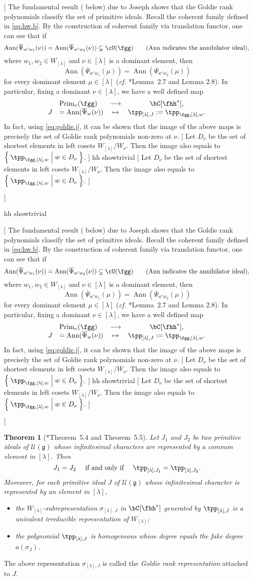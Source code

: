 \documentclass[12pt,a4paper]{amsart}
\newcommand{\trivial}[2][]{\if\relax\detokenize{#1}\relax
  {%
      \color{orange} \vspace{0em} $[$  #2 $]$
      \color{black}
  }
  \else
\ifx#1h
\ifcsname showtrivial\endcsname
{%
    \color{orange} \vspace{0em}  $[$ #2 $]$
    \color{black}
}
\fi
\else {\red Wrong argument!} \fi
\fi
}
\newcommand{\CU}{{\mathcal {U}}}
\DeclareMathOperator{\Ann}{Ann}
\newcommand{\g}{\mathfrak g}
\numberwithin{equation}{section}
\newtheorem{thm}{Theorem}[section]
\theoremstyle{remark}
\def\cf{\emph{cf.} }
\def\WLam{W_{\Lam}}
\def\Prim{\mathrm{Prim}}
\def\Prim{\mathrm{Prim}}
\newcommand{\Lam}{{[\lambda]}}
\begin{document}
\trivial[h]{
The fundamental result ( below) due to Joseph shows that the Goldie rank polynomials
classify the set of primitive ideals.
 Recall the coherent family defined in \eqref{eq:hw.b}.
By the construction of coherent family via translation functor, one can see that if
\[
\Ann(\overline\Psi_{w' w_1} (\nu)) = \Ann(\overline \Psi_{w' w_2}(\nu))\subsetneq \cU(\fgg)\qquad(\textrm{$\Ann$ indicates the annihilator ideal}),
\]
where $w_1,w_2\in \WLam$ and $\nu\in \Lam$ is a dominant element, then
\[
\Ann(\overline\Psi_{w'w_1} (\mu)) = \Ann(\overline \Psi_{w'w_2}(\mu))
\]
 for every dominant
element $\mu\in \Lam$ (\cf \cite{V1}*{Lemma~2.7 and Lemma 2.8}).
In particular, fixing a dominant $\nu\in \Lam$, we have a well defined map
\[
\begin{array}{rlcc}
&\Prim_{\nu}(\fgg) &\longrightarrow &\bC[\fhh^*],\\
J &= \Ann(\overline \Psi_{w}(\nu) ) & \mapsto & \tpp_{\Lam, J}:= \tpp_{\fgg,\Lam,w}.
\end{array}
\]
In fact, using \eqref{eq:goldie.j}, it can be shown that the image of the above maps is precisely
the set of Goldie rank polynomials non-zero at $\nu$.
\trivial[h]{
Let $D_{\nu}$ be the set of shortest elements in left cosets $\WLam/W_{\nu}$.
Then the image also equals to $\Set{\tpp_{\fgg,\Lam,w}|w\in D_{\nu}}$.
}
}
\begin{thm}[\cite{J2}*{Theorem~5.4 and Theorem~5.5}]
  \label{thm:prim}
   Let $J_1$ and $J_2$ be two primitive ideals of $\CU(\g)$ whose infinitesimal characters are represented by a common element in $\Lam$.
 Then  \[
    J_{1}= J_{2}\quad  \text{ if and only if }\quad \tpp_{\Lam, J_{1}} =\tpp_{\Lam, J_{2}}.
  \]
  Moreover, for each  primitive ideal $J$ of $\CU(\g)$ whose infinitesimal character is represented by an element in $\Lam$,
  \begin{itemize}
    \item
     the $\WLam$-subrepresentation $\sigma_{\Lam, J}$ in $\bC[\fhh^{*}]$ generated by
    $\tpp_{\Lam, J}$ is a univalent irreducible representation of $\WLam$;
   \item the polynomial $\tpp_{\Lam,J}$ is homogeneous whose degree equals the fake
  degree $a(\sigma_{J})$.
 \end{itemize}


\end{thm}
  The above representation $\sigma_{\Lam, J}$ is called the \emph{Goldie rank representation} attached to $J$.
\end{document}
